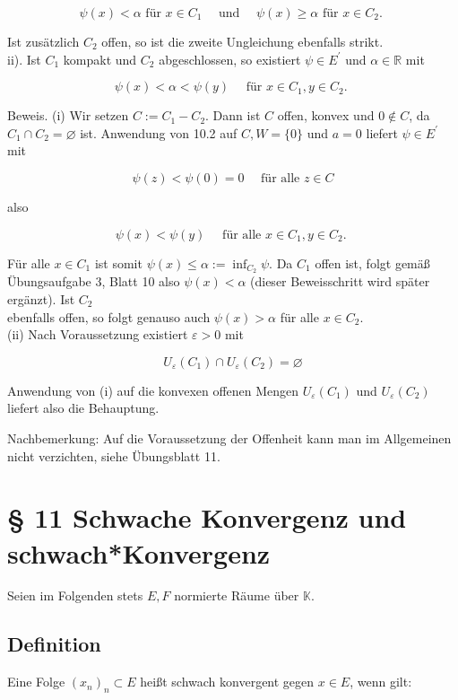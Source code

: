 \documentclass[10pt, letterpaper]{article}
\begin{document}
$$
\psi(x)<\alpha \text { für } x \in C_{1} \quad \text { und } \quad \psi(x) \geq \alpha \text { für } x \in C_{2} \text {. }
$$

Ist zusätzlich $C_{2}$ offen, so ist die zweite Ungleichung ebenfalls strikt.\\
ii). Ist $C_{1}$ kompakt und $C_{2}$ abgeschlossen, so existiert $\psi \in E^{\prime}$ und $\alpha \in \mathbb{R}$ mit

$$
\psi(x)<\alpha<\psi(y) \quad \text { für } x \in C_{1}, y \in C_{2} \text {. }
$$

Beweis. (i) Wir setzen $C:=C_{1}-C_{2}$. Dann ist $C$ offen, konvex und $0 \notin C$, da $C_{1} \cap C_{2}=\varnothing$ ist. Anwendung von 10.2 auf $C, W=\{0\}$ und $a=0$ liefert $\psi \in E^{\prime}$ mit

$$
\psi(z)<\psi(0)=0 \quad \text { für alle } z \in C
$$

also

$$
\psi(x)<\psi(y) \quad \text { für alle } x \in C_{1}, y \in C_{2} \text {. }
$$

Für alle $x \in C_{1}$ ist somit $\psi(x) \leq \alpha:=\inf _{C_{2}} \psi$. Da $C_{1}$ offen ist, folgt gemäß Übungsaufgabe 3, Blatt 10 also $\psi(x)<\alpha$ (dieser Beweisschritt wird später ergänzt). Ist $C_{2}$\\
ebenfalls offen, so folgt genauso auch $\psi(x)>\alpha$ für alle $x \in C_{2}$.\\
(ii) Nach Voraussetzung existiert $\varepsilon>0$ mit

$$
U_{\varepsilon}\left(C_{1}\right) \cap U_{\varepsilon}\left(C_{2}\right)=\varnothing
$$

Anwendung von (i) auf die konvexen offenen Mengen $U_{\varepsilon}\left(C_{1}\right)$ und $U_{\varepsilon}\left(C_{2}\right)$ liefert also die Behauptung.

Nachbemerkung: Auf die Voraussetzung der Offenheit kann man im Allgemeinen nicht verzichten, siehe Übungsblatt 11.

\section*{§ 11 Schwache Konvergenz und schwach*Konvergenz}
Seien im Folgenden stets $E, F$ normierte Räume über $\mathbb{K}$.

\subsection*{Definition}
Eine Folge $\left(x_{n}\right)_{n} \subset E$ heißt schwach konvergent gegen $x \in E$, wenn gilt:
\end{document}
